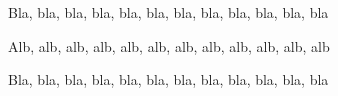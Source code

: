 \documentclass{../main/main}
\begin{document}
Bla, bla, bla, bla, bla, bla, bla, bla, bla, bla, bla, bla

\tdocsep

Alb, alb, alb, alb, alb, alb, alb, alb, alb, alb, alb, alb

\vspace{22.75cm}

\tdocsep

Bla, bla, bla, bla, bla, bla, bla, bla, bla, bla, bla, bla
\end{document}
